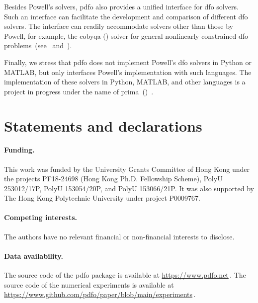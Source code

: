 \documentclass[
    smallextended,  %
    final,          %
]{svjour3}
\begin{document}
Besides Powell's solvers, \gls{pdfo} also provides a unified interface for \gls{dfo} solvers.
Such an interface can facilitate the development and comparison of different \gls{dfo} solvers.
The interface can readily accommodate solvers other than those by Powell, for example,
the \gls{cobyqa} () solver for general nonlinearly
constrained \gls{dfo} problems~(see~\cite[Chapters 5--7]{Ragonneau_2022}
and~\cite{Ragonneau_Zhang_cobyqa}).

Finally, we stress that \gls{pdfo} does not implement Powell's \gls{dfo} solvers in Python
or MATLAB, but only interfaces Powell's implementation with such languages. The implementation of
these solvers in Python, \mbox{MATLAB}, and other languages is a project in progress under the name of
\gls{prima}~()~\cite{Zhang_prima}.


\section*{Statements and declarations}

\paragraph{\textnormal{\textbf{Funding.}}}

This work was funded by the University Grants Committee of Hong Kong under the
projects PF18-24698 (Hong Kong Ph.D. Fellowship Scheme), PolyU 253012/17P, PolyU 153054/20P,
and PolyU 153066/21P.
It was also supported by The Hong Kong Polytechnic University under project P0009767.

\paragraph{\textnormal{\textbf{Competing interests.}}}

The authors have no relevant financial or non-financial interests to disclose.

\paragraph{\textnormal{\textbf{Data availability.}}}

The source code of the \gls{pdfo} package is available at \mbox{\url{https://www.pdfo.net}}\,.
The source code of the numerical experiments is available at
\mbox{\url{https://www.github.com/pdfo/paper/blob/main/experiments}}\,.



\end{document}
